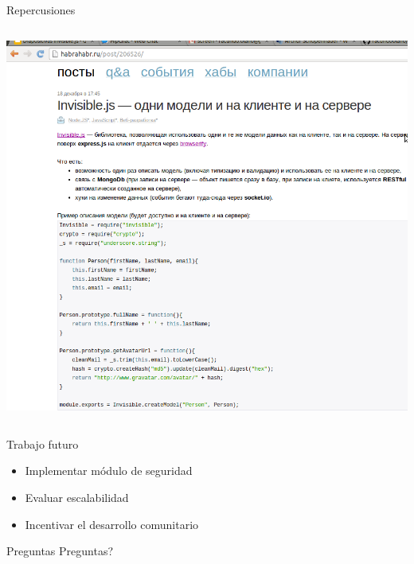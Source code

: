 \documentclass[xcolor=dvipsnames, 14pt]{beamer}
\newenvironment{reference}[2]{%
  \begin{textblock*}{\textwidth}(#1,#2)
      \footnotesize\it\bgroup\color{gray!50!black}}{\egroup\end{textblock*}}
\begin{document}
\begin{frame}{Repercusiones}
\begin{columns}[t]
\begin{column}{0.5\textwidth}
    \begin{center}
        \includegraphics[width=\textwidth]{img/rusia.png}
    \end{center}
\end{column}
\end{columns}


\end{frame}

\begin{frame}{Trabajo futuro}
\begin{itemize}
    \item Implementar módulo de seguridad
    \item Evaluar escalabilidad
    \item Incentivar el desarrollo comunitario
\end{itemize}

\end{frame}

\begin{frame}[c]{Preguntas}
\Huge Preguntas?
\end{frame}

\end{document}
